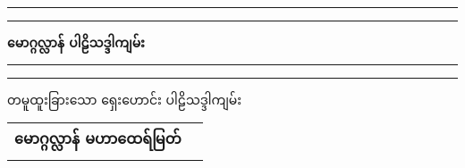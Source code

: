 %
\frontmatter
\begin{titlepage} %

	\centering %
	
	\scshape %
	
	\vspace*{\baselineskip} %
	
	
	\rule{\textwidth}{1.6pt}\vspace*{-\baselineskip}\vspace*{2pt} %
	\rule{\textwidth}{0.4pt} %
	
	\vspace{0.75\baselineskip} %
	
	{\LARGE \textbf{မောဂ္ဂလ္လာန် ပါဠိသဒ္ဒါကျမ်း}\\} %
	
	\vspace{0.75\baselineskip} %
	
	\rule{\textwidth}{0.4pt}\vspace*{-\baselineskip}\vspace{3.2pt} %
	\rule{\textwidth}{1.6pt} %
	
	\vspace{2\baselineskip} %
	
	
	တမူထူးခြား​သော ရှေး​ဟောင်း ပါဠိသဒ္ဒါကျမ်း %
	
	\vspace*{3\baselineskip} %
	
	
	
	\vspace{0.5\baselineskip} %
	
	{\scshape\Large \begin{table}[h]
	\centering
	\begin{tabular}{rl}
        \textbf{မောဂ္ဂလ္လာန် မဟာ​ထေရ်မြတ်}
	\end{tabular}
\end{table}
} %
	

\end{titlepage}
